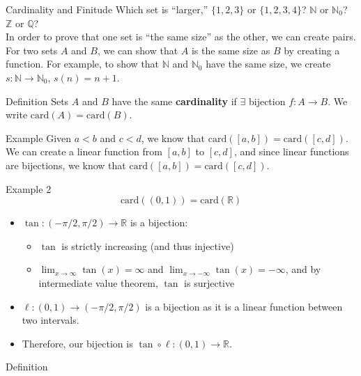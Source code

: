 \documentclass[10pt]{extarticle}
\begin{document}
  \begin{problem}{Cardinality and Finitude}
    Which set is ``larger,'' $\{1,2,3\}$ or $\{1,2,3,4\}$? $\mathbb{N}$ or $\mathbb{N}_0$? $\mathbb{Z}$ or $\mathbb{Q}$?\\

    In order to prove that one set is ``the same size'' as the other, we can create pairs. For two sets $A$ and $B$, we can show that $A$ is the same size as $B$ by creating a function. For example, to show that $\mathbb{N}$ and $\mathbb{N}_0$ have the same size, we create $s:\mathbb{N} \rightarrow \mathbb{N}_0$, $s(n) = n+1$.

    \begin{problem}{Definition}
      Sets $A$ and $B$ have the same \textbf{cardinality} if $\exists$ bijection $f:A\rightarrow B$. We write $\textrm{card}(A) = \textrm{card}(B)$.
    \end{problem}
    \begin{problem}{Example}
      Given $a<b$ and $c<d$, we know that $\textrm{card}\left([a,b]\right) = \textrm{card}\left([c,d]\right)$.
      \tcblower
      We can create a linear function from $[a,b]$ to $[c,d]$, and since linear functions are bijections, we know that $\textrm{card}\left([a,b]\right) = \textrm{card}\left([c,d]\right)$.
    \end{problem}
    \begin{problem}{Example 2}
      \[
        \textrm{card}\left((0,1)\right) = \textrm{card}(\mathbb{R})
      \] 
      \tcblower
      \begin{itemize}
        \item $\tan: (-\pi/2,\pi/2) \rightarrow \mathbb{R}$ is a bijection:
          \begin{itemize}
            \item $\tan$ is strictly increasing (and thus injective)
            \item $\lim_{x\rightarrow\infty} \tan(x) = \infty$ and $\lim_{x\rightarrow -\infty}\tan(x) = -\infty$, and by intermediate value theorem, $\tan$ is surjective
          \end{itemize}
        \item $\ell: (0,1) \rightarrow (-\pi/2,\pi/2)$ is a bijection as it is a linear function between two intervals.
        \item Therefore, our bijection is $\tan \circ \ell: (0,1) \rightarrow \mathbb{R}$.
      \end{itemize}
    \end{problem}
    \begin{problem}{Definition}

\end{problem}
\end{problem}
\end{document}
